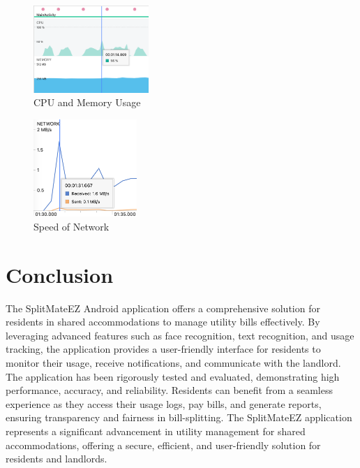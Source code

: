 \documentclass[sigconf,nonacm]{acmart}\settopmatter{printfolios=true}
\begin{document}
\begin{figure}[htbp]
  \includegraphics[width=0.39\textwidth]{CPU_memory.png}
  \caption{CPU and Memory Usage}
  \label{fig:cpuMemory}
\end{figure}
\begin{figure}[htbp]
  \includegraphics[width=0.35\textwidth]{network.png}
  \caption{Speed of Network}
  \label{fig:network}
\end{figure}

\section{Conclusion}
The SplitMateEZ Android application offers a comprehensive solution for residents in shared accommodations to manage utility bills effectively. By leveraging advanced features such as face recognition, text recognition, and usage tracking, the application provides a user-friendly interface for residents to monitor their usage, receive notifications, and communicate with the landlord. The application has been rigorously tested and evaluated, demonstrating high performance, accuracy, and reliability. Residents can benefit from a seamless experience as they access their usage logs, pay bills, and generate reports, ensuring transparency and fairness in bill-splitting. The SplitMateEZ application represents a significant advancement in utility management for shared accommodations, offering a secure, efficient, and user-friendly solution for residents and landlords.
\end{document}
